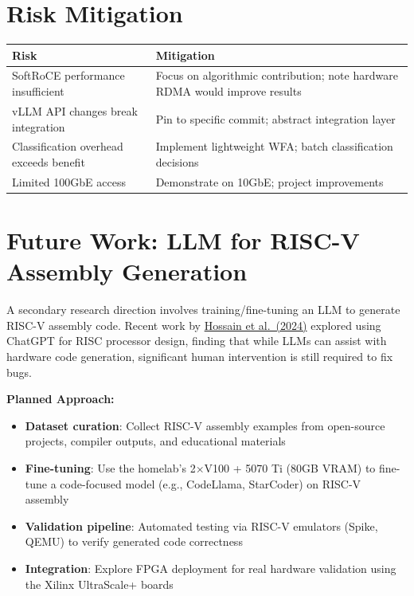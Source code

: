 \documentclass[10pt,letterpaper]{article}
\begin{document}
\section{Risk Mitigation}

\begin{table}[h]
\centering
\small
\begin{tabular}{@{}p{4cm}p{5cm}@{}}
\toprule
\textbf{Risk} & \textbf{Mitigation} \\
\midrule
SoftRoCE performance insufficient & Focus on algorithmic contribution; note hardware RDMA would improve results \\
vLLM API changes break integration & Pin to specific commit; abstract integration layer \\
Classification overhead exceeds benefit & Implement lightweight WFA; batch classification decisions \\
Limited 100GbE access & Demonstrate on 10GbE; project improvements \\
\bottomrule
\end{tabular}
\end{table}

\section{Future Work: LLM for RISC-V Assembly Generation}

A secondary research direction involves training/fine-tuning an LLM to generate RISC-V assembly code. Recent work by \href{https://arxiv.org/abs/2401.10364}{Hossain et al.\ (2024)} explored using ChatGPT for RISC processor design, finding that while LLMs can assist with hardware code generation, significant human intervention is still required to fix bugs.

\textbf{Planned Approach:}
\begin{itemize}[noitemsep]
    \item \textbf{Dataset curation}: Collect RISC-V assembly examples from open-source projects, compiler outputs, and educational materials
    \item \textbf{Fine-tuning}: Use the homelab's 2$\times$V100 + 5070 Ti (80GB VRAM) to fine-tune a code-focused model (e.g., CodeLlama, StarCoder) on RISC-V assembly
    \item \textbf{Validation pipeline}: Automated testing via RISC-V emulators (Spike, QEMU) to verify generated code correctness
    \item \textbf{Integration}: Explore FPGA deployment for real hardware validation using the Xilinx UltraScale+ boards
\end{itemize}
\end{document}
